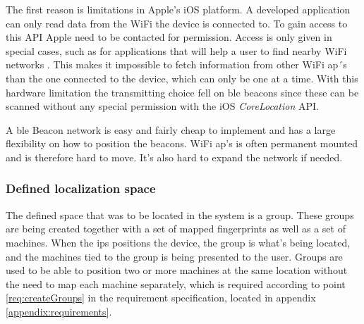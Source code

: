 \bigskip

The first reason is limitations in Apple's iOS platform.
A developed application can only read data from the WiFi the device is connected to.
To gain access to this API Apple need to be contacted for permission.
Access is only given in special cases, such as for applications that will help a user to find nearby WiFi networks \cite{TechnicalQA1942IOS}.
This makes it impossible to fetch information from other WiFi \acrshort{ap}´s than the one connected to the device, which can only be one at a time.
With this hardware limitation the transmitting choice fell on \acrshort{ble} beacons since these can be scanned without any special permission with the iOS \textit{CoreLocation} API.

\bigskip

A \acrshort{ble} Beacon network is easy and fairly cheap to implement and has a large flexibility on how to position the beacons.
WiFi \acrshort{ap}'s is often permanent mounted and is therefore hard to move.
It's also hard to expand the network if needed.


\subsubsection{Defined localization space}\label{sec:methodSoftwareDesignDefinedSpace} The defined space that was to be located in the system is a group.
These groups are being created together with a set of mapped fingerprints as well as a set of machines.
When the \acrshort{ips} positions the device, the group is what's being located, and the machines tied to the group is being presented to the user.
Groups are used to be able to position two or more machines at the same location without the need to map each machine separately, which is required according to point \ref{req:createGroups} in the requirement specification, located in appendix \ref{appendix:requirements}.
